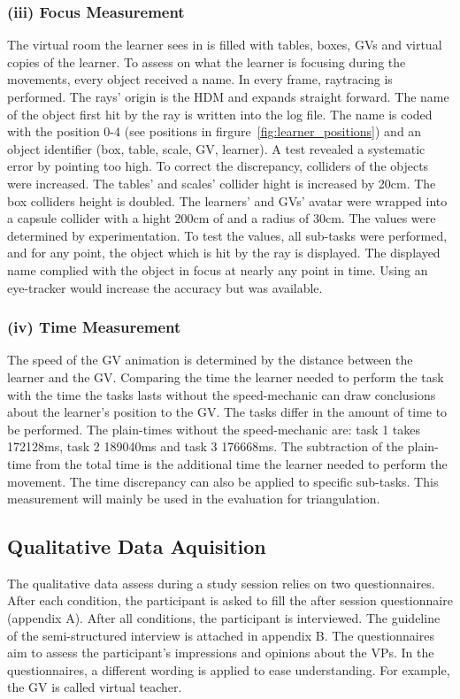 \subsubsection{(iii) Focus Measurement}
\label{sec:rayTrace}
The virtual room the learner sees in \exgo is filled with tables, boxes, GVs and virtual copies of the learner. To assess on what the learner is focusing during the movements, every object received a name. In every frame, raytracing is performed. The rays' origin is the HDM and expands straight forward. The name of the object first hit by the ray is written into the log file. The name is coded with the position 0-4 (see positions in firgure~\ref{fig:learner_positions}) and an object identifier (box, table, scale, GV, learner). A test revealed a systematic error by pointing too high. To correct the discrepancy, colliders of the objects were increased. The tables' and scales' collider hight is increased by 20cm. The box colliders height is doubled. The learners' and GVs' avatar were wrapped into a capsule collider with a hight 200cm of and a radius of 30cm. The values were determined by experimentation. To test the values, all sub-tasks were performed, and for any point, the object which is hit by the ray is displayed. The displayed name complied with the object in focus at nearly any point in time. Using an eye-tracker would increase the accuracy but was available.

\subsubsection{(iv) Time Measurement}
The speed of the GV animation is determined by the distance between the learner and the GV. Comparing the time the learner needed to perform the task with the time the tasks lasts without the speed-mechanic can draw conclusions about the learner's position to the GV. The tasks differ in the amount of time to be performed. The plain-times without the speed-mechanic are: task 1 takes 172128ms, task 2 189040ms and task 3 176668ms. The subtraction of the plain-time from the total time is the additional time the learner needed to perform the movement. The time discrepancy can also be applied to specific sub-tasks. This measurement will mainly be used in the evaluation for triangulation. 

\subsection{Qualitative Data Aquisition}
\label{sec:quali_logging}
The qualitative data assess during a study session relies on two questionnaires. After each condition, the participant is asked to fill the after session questionnaire (appendix A). After all conditions, the participant is interviewed. The guideline of the semi-structured interview is attached in appendix B. The questionnaires aim to assess the participant's impressions and opinions about the VPs. In the questionnaires, a different wording is applied to ease understanding. For example, the GV is called virtual teacher. 

